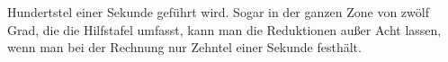 %
Hundertstel einer Sekunde geführt wird. Sogar in der ganzen Zone von zwölf Grad, die die Hilfstafel umfasst, kann man die Reduktionen außer Acht lassen, wenn man bei der Rechnung nur Zehntel einer Sekunde festhält.

